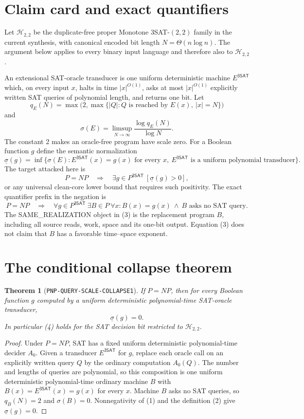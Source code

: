 \documentclass[11pt]{article}
\newtheorem{theorem}{Theorem}
\newcommand{\SAT}{\mathsf{3SAT}}
\newcommand{\Htwo}{\mathcal H_{2,2}}
\begin{document}
\section{Claim card and exact quantifiers}

Let $\Htwo$ be the duplicate-free proper Monotone $3$SAT-$(2,2)$ family in
the current synthesis, with canonical encoded bit length
$N=\Theta(n\log n)$.  The argument below applies to every binary input
language and therefore also to $\Htwo$.

An extensional SAT-oracle transducer is one uniform deterministic machine
$E^{\SAT}$ which, on every input $x$, halts in time $|x|^{O(1)}$, asks at most
$|x|^{O(1)}$ explicitly written SAT queries of polynomial length, and returns
one bit.  Let
\[
 q_E(N)=\max\bigl(2,\max\{|Q|:Q\text{ is reached by }E(x),\ |x|=N\}\bigr)
\]
and
\[
 \sigma(E)=\limsup_{N\to\infty}\frac{\log q_E(N)}{\log N}.
 \tag{1}
\]
The constant 2 makes an oracle-free program have scale zero.  For a Boolean
function $g$ define the semantic normalization
\[
 \underline\sigma(g)=
 \inf\{\sigma(E):E^{\SAT}(x)=g(x)\text{ for every }x,
 \ E^{\SAT}\text{ is a uniform polynomial transducer}\}.
 \tag{2}
\]
The target attacked here is
\[
 P=NP\quad\Longrightarrow\quad
 \exists g\in P^{\SAT}\ [\underline\sigma(g)>0],
 \tag{NS}
\]
or any universal clean-core lower bound that requires such positivity.
The exact quantifier prefix in the negation is
\[
 P=NP\quad\Longrightarrow\quad
 \forall g\in P^{\SAT}\ \exists B\in P\ \forall x:
 B(x)=g(x)\ \land\ B\text{ asks no SAT query}.
 \tag{3}
\]
The SAME\_REALIZATION object in (3) is the replacement program $B$, including
all source reads, work, space and its one-bit output.  Equation (3) does not
claim that $B$ has a favorable time--space exponent.

\section{The conditional collapse theorem}

\begin{theorem}[\texttt{PNP-QUERY-SCALE-COLLAPSE1}]
If $P=NP$, then for every Boolean function $g$ computed by a uniform
deterministic polynomial-time SAT-oracle transducer,
\[
 \underline\sigma(g)=0.
 \tag{4}
\]
In particular (4) holds for the SAT decision bit restricted to $\Htwo$.
\end{theorem}

\begin{proof}
Under $P=NP$, SAT has a fixed uniform deterministic polynomial-time decider
$A_0$.  Given a transducer $E^{\SAT}$ for $g$, replace each oracle call on an
explicitly written query $Q$ by the ordinary computation $A_0(Q)$.  The
number and lengths of queries are polynomial, so this composition is one
uniform deterministic polynomial-time ordinary machine $B$ with
$B(x)=E^{\SAT}(x)=g(x)$ for every $x$.  Machine $B$ asks no SAT queries, so
$q_B(N)=2$ and $\sigma(B)=0$.  Nonnegativity of (1) and the definition (2)
give $\underline\sigma(g)=0$.
\end{proof}
\end{document}
